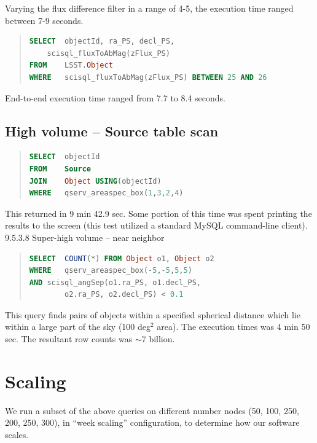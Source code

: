 \documentclass[DM,toc]{lsstdoc}
\begin{document}
Varying the flux difference filter in a range of 4-5, the execution time ranged between 7-9 seconds.

\begin{quote}
\begin{lstlisting}[language=SQL]
SELECT	objectId, ra_PS, decl_PS,
	scisql_fluxToAbMag(zFlux_PS)
FROM	LSST.Object
WHERE	scisql_fluxToAbMag(zFlux_PS) BETWEEN 25 AND 26
\end{lstlisting}
\end{quote}

End-to-end execution time ranged from 7.7 to 8.4 seconds.

\subsection{High volume – Source table scan}

\begin{quote}
\begin{lstlisting}[language=SQL]
SELECT	objectId
FROM	Source
JOIN	Object USING(objectId)
WHERE	qserv_areaspec_box(1,3,2,4)
\end{lstlisting}
\end{quote}

This returned in 9 min 42.9 sec. Some portion of this time was spent printing the results to the screen (this test utilized a standard MySQL command-line client).
9.5.3.8 Super-high volume – near neighbor

\begin{quote}
\begin{lstlisting}[language=SQL]
SELECT	COUNT(*) FROM Object o1, Object o2
WHERE	qserv_areaspec_box(-5,-5,5,5)
AND	scisql_angSep(o1.ra_PS, o1.decl_PS,
		o2.ra_PS, o2.decl_PS) < 0.1
\end{lstlisting}
\end{quote}

This query finds pairs of objects within a specified spherical distance which lie within a large part of the sky (100 deg$^2$ area). The execution times was 4 min 50 sec. The resultant row counts was $\sim$7 billion.
\section{Scaling}

We run a subset of the above queries on different number nodes (50, 100, 250, 200, 250, 300), in ``week scaling'' configuration, to determine how our software scales.
\end{document}
